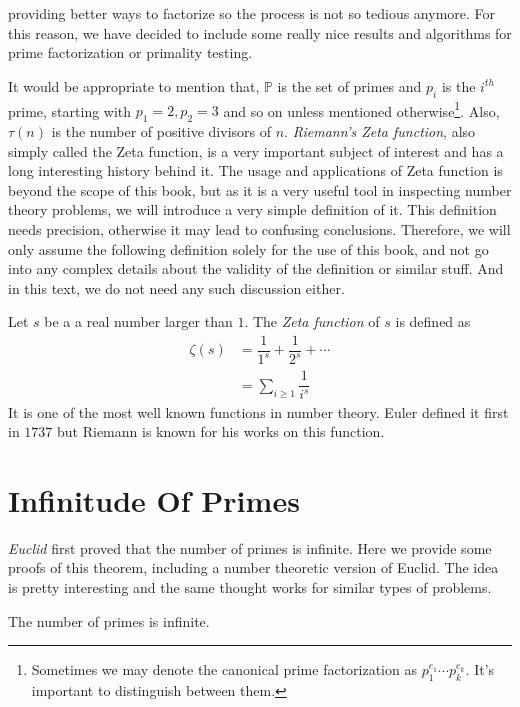 \documentclass{subfiles}
\begin{document}
providing better ways to factorize so the process is not so tedious anymore. For this reason, we have decided to include some really nice results and algorithms for prime factorization or primality testing.

	It would be appropriate to mention that, $\mathbb{P}$ is the set of primes and $p_i$ is the $i^{th}$ prime, starting with $p_1=2,p_2=3$ and so on unless mentioned otherwise\footnote{Sometimes we may denote the canonical prime factorization as $p_1^{e_1}\cdots p_k^{e_k}$. It's important to distinguish between them.}. Also, $\tau(n)$ is the number of positive divisors of $n$. \textit{Riemann's Zeta function}, also simply called the Zeta function, is a very important subject of interest and has a long interesting history behind it. The usage and applications of Zeta function is beyond the scope of this book, but as it is a very useful tool in inspecting number theory problems, we will introduce a very simple definition of it. This definition needs precision, otherwise it may lead to confusing conclusions. Therefore, we will only assume the following definition solely for the use of this book, and not go into any complex details about the validity of the definition or similar stuff. And in this text, we do not need any such discussion either.
		\begin{definition}
			Let $s$ be a a real number larger than $1$. The \textit{Zeta function} of $s$ is defined as
				\begin{align*}
					\zeta(s)
						& =\dfrac{1}{1^s}+\dfrac{1}{2^s}+\cdots\\
						& =\sum_{i\geq1}\dfrac{1}{i^s}
				\end{align*}
			It is one of the most well known functions in number theory. Euler defined it first in $1737$ but Riemann is known for his works on this function.
		\end{definition}
	\section{Infinitude Of Primes}
	\label{sec:infiniteprimes}
	\textit{Euclid} first proved that the number of primes is infinite. Here we provide some proofs of this theorem, including a number theoretic version of Euclid. The idea is pretty interesting and the same thought works for similar types of problems.
		\begin{theorem}
			The number of primes is infinite.
		\end{theorem}
\end{document}
